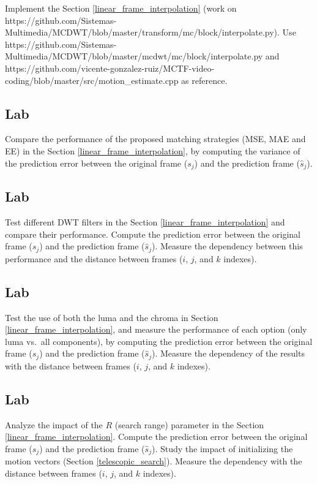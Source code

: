 {\begin{enumerate}
Implement the Section \ref{linear_frame_interpolation} (work on
https://github.com/Sistemas-Multimedia/MCDWT/blob/master/transform/mc/block/interpolate.py).
Use
https://github.com/Sistemas-Multimedia/MCDWT/blob/master/mcdwt/mc/block/interpolate.py
and
https://github.com/vicente-gonzalez-ruiz/MCTF-video-coding/blob/master/src/motion\_estimate.cpp
as reference.

    \hypertarget{lab}{%
\subsection{Lab}\label{lab}}

Compare the performance of the proposed matching strategies (MSE, MAE
and EE) in the Section \ref{linear_frame_interpolation}, by computing
the variance of the prediction error between the original frame
(\(s_j\)) and the prediction frame (\(\hat{s}_j\)).

    \hypertarget{lab}{%
\subsection{Lab}\label{lab}}

Test different DWT filters in the
Section \ref{linear_frame_interpolation} and compare their performance.
Compute the prediction error between the original frame (\(s_j\)) and
the prediction frame (\(\hat{s}_j\)). Measure the dependency between
this performance and the distance between frames (\(i\), \(j\), and
\(k\) indexes).

    \hypertarget{lab}{%
\subsection{Lab}\label{lab}}

Test the use of both the luma and the chroma in
Section \ref{linear_frame_interpolation}, and measure the performance of
each option (only luma vs.~all components), by computing the prediction
error between the original frame (\(s_j\)) and the prediction frame
(\(\hat{s}_j\)). Measure the dependency of the results with the distance
between frames (\(i\), \(j\), and \(k\) indexes).

    \hypertarget{lab}{%
\subsection{Lab}\label{lab}}

Analyze the impact of the \(R\) (search range) parameter in the
Section \ref{linear_frame_interpolation}. Compute the prediction error
between the original frame (\(s_j\)) and the prediction frame
(\(\hat{s}_j\)). Study the impact of initializing the motion vectors
(Section \ref{telescopic_search}). Measure the dependency with the
distance between frames (\(i\), \(j\), and \(k\) indexes).


\end{enumerate}}

